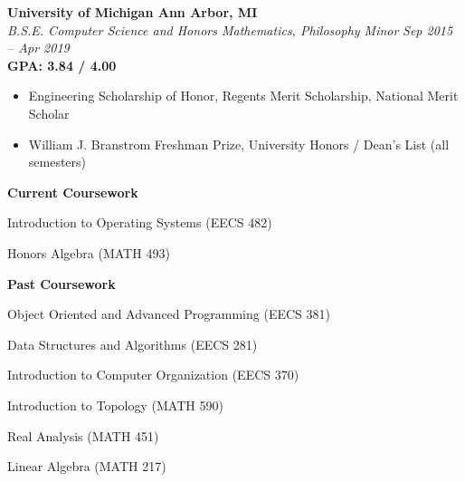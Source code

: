 \documentclass[margin,line]{resume}
\begin{document}
\begin{resume}
	\textbf{University of Michigan \hfill Ann Arbor, MI} \\\vspace{1mm}%
	\textsl{B.S.E. Computer Science and Honors Mathematics, Philosophy Minor} \hfill \textsl{Sep 2015 -- Apr 2019}\vspace{-1mm}\\
	\textbf{GPA: 3.84 / 4.00} \\\vspace{-2.5mm}%
	\begin{itemize}[leftmargin=4mm]
		\item Engineering Scholarship of Honor, Regents Merit Scholarship, National Merit Scholar
		\item William J. Branstrom Freshman Prize, University Honors / Dean's List (all semesters)
	\end{itemize}
	\vspace{-5mm}
	\begin{center} \textbf{Current Coursework} \end{center}
	\vspace{-3mm}
	\small
	\begin{itemize}[leftmargin=4mm]
		\begin{minipage}[t]{.6\linewidth}
			\item Introduction to Operating Systems (EECS 482)
		\end{minipage}%
		\begin{minipage}[t]{.5\linewidth}
			\item Honors Algebra (MATH 493)
		\end{minipage}%
	\end{itemize}
	\normalsize
	\vspace{-8mm}
	\begin{center} \textbf{Past Coursework} \end{center}
	\vspace{-3mm}
	\small
	\begin{itemize}[leftmargin=4mm]
		\begin{minipage}[t]{.6\linewidth}
			\item Object Oriented and Advanced Programming (EECS 381)
			\item Data Structures and Algorithms (EECS 281)
			\item Introduction to Computer Organization (EECS 370)
		\end{minipage}%
		\begin{minipage}[t]{.5\linewidth}
			\item Introduction to Topology (MATH 590)
			\item Real Analysis (MATH 451)
			\item Linear Algebra (MATH 217)
		\end{minipage}%
	\end{itemize}
	\normalsize
	\sectionbreak
	\vspace{-2.5mm}

\end{resume}
\end{document}
